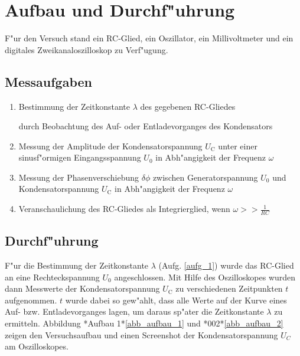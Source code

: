 \documentclass{scrartcl}
\begin{document}
	\section{Aufbau und Durchf"uhrung}

		F"ur den Versuch stand ein RC-Glied, ein Oszillator, ein Millivoltmeter und ein digitales Zweikanaloszilloskop zu Verf"ugung.


		\subsection{Messaufgaben}

			\begin{enumerate}
				\item \label{aufg_1} Bestimmung der Zeitkonstante $\lambda$ des gegebenen RC-Gliedes

				durch Beobachtung des Auf- oder Entladevorganges des Kondensators
				\item \label{aufg_2} Messung der Amplitude der Kondensatorspannung $U_{\mathrm{C}}$ unter einer sinusf"ormigen Eingangsspannung $U_0$ in Abh"angigkeit der Frequenz $\omega$

				\item \label{aufg_3} Messung der Phasenverschiebung $\delta \phi$ zwischen Generatorspannung $U_0$ und Kon\-den\-sator\-spannung $U_{\mathrm{C}}$ in Abh"angigkeit der Frequenz $\omega$

				\item \label{aufg_4} Veranschaulichung des RC-Gliedes als Integrierglied, wenn $\omega >> \frac{1}{RC}$

			\end{enumerate}

		\subsection{Durchf"uhrung}

			F"ur die Bestimmung der Zeitkonstante $\lambda$ (Aufg. \ref{aufg_1}) wurde das RC-Glied an eine Rechteck\-spannung $U_0$ angeschlossen.
			Mit Hilfe des Oszilloskopes wurden dann Messwerte der Kondensatorspannung $U_{\mathrm{C}}$ zu verschiedenen Zeitpunkten $t$ aufgenommen.
			$t$ wurde dabei so gew"ahlt, dass alle Werte auf der Kurve eines Auf- bzw. Entladevorganges lagen,
			um daraus sp"ater die Zeitkonstante $\lambda$ zu ermitteln.
			Abbildung *Aufbau 1*\ref{abb_aufbau_1} und *002*\ref{abb_aufbau_2} zeigen den Versuchsaufbau und einen Screenshot der Kondensatorspannung $U_C$ am Oszilloskopes.\\
\end{document}
